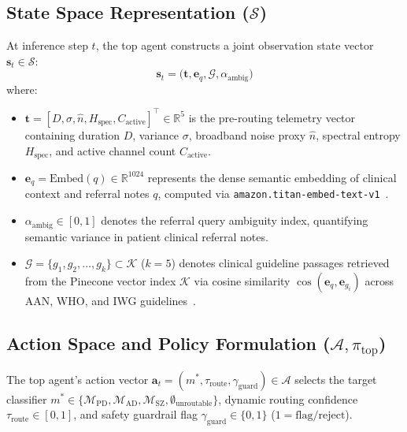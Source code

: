 \documentclass[runningheads]{llncs}
\begin{document}
\subsection{State Space Representation ($\mathcal{S}$)}
At inference step $t$, the top agent constructs a joint observation state vector $\mathbf{s}_t \in \mathcal{S}$:
\begin{equation}
\mathbf{s}_t = \big( \mathbf{t}, \mathbf{e}_q, \mathcal{G}, \alpha_{\text{ambig}} \big)
\end{equation}
where:
\begin{itemize}
    \item $\mathbf{t} = [D, \sigma, \hat{n}, H_{\text{spec}}, C_{\text{active}}]^\top \in \mathbb{R}^5$ is the pre-routing telemetry vector containing duration $D$, variance $\sigma$, broadband noise proxy $\hat{n}$, spectral entropy $H_{\text{spec}}$, and active channel count $C_{\text{active}}$.
    \item $\mathbf{e}_q = \text{Embed}(q) \in \mathbb{R}^{1024}$ represents the dense semantic embedding of clinical context and referral notes $q$, computed via \texttt{amazon.titan-embed-text-v1}~\cite{titan}.
    \item $\alpha_{\text{ambig}} \in [0,1]$ denotes the referral query ambiguity index, quantifying semantic variance in patient clinical referral notes.
    \item $\mathcal{G} = \{g_1, g_2, \dots, g_k\} \subset \mathcal{K}$ ($k=5$) denotes clinical guideline passages retrieved from the Pinecone vector index $\mathcal{K}$ via cosine similarity $\cos(\mathbf{e}_q, \mathbf{e}_{g_i})$ across AAN, WHO, and IWG guidelines~\cite{aan, who}.
\end{itemize}

\subsection{Action Space and Policy Formulation ($\mathcal{A}, \pi_{\text{top}}$)}
The top agent's action vector $\mathbf{a}_t = (m^*, \tau_{\text{route}}, \gamma_{\text{guard}}) \in \mathcal{A}$ selects the target classifier $m^* \in \{\mathcal{M}_{\text{PD}}, \mathcal{M}_{\text{AD}}, \mathcal{M}_{\text{SZ}}, \emptyset_{\text{unroutable}}\}$, dynamic routing confidence $\tau_{\text{route}} \in [0,1]$, and safety guardrail flag $\gamma_{\text{guard}} \in \{0,1\}$ ($1 = \text{flag/reject}$).
\end{document}
